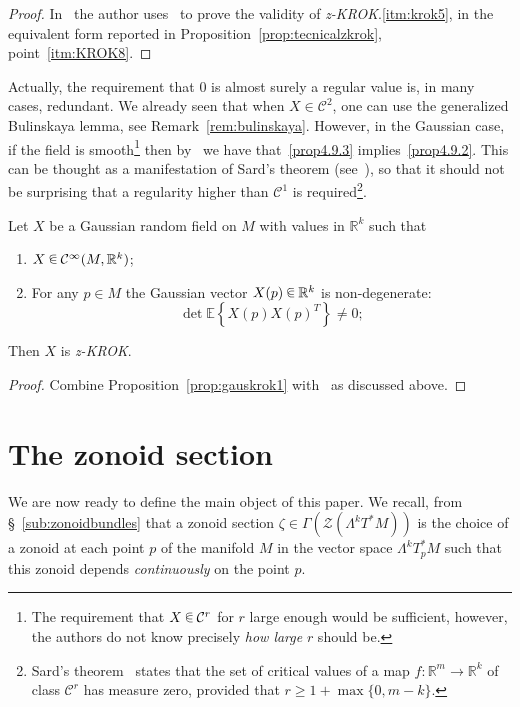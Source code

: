 \documentclass[AHL, Unicode, longabstracts, published]{cedram}
\newcommand{\R}{\mathbb{R}}
\newcommand{\EE}{\mathbb{E}}
\newcommand{\ZZ}{\mathscr{Z}}
\newcommand{\mC}{\mathcal{C}}
\newcommand{\zkrok}{\emph{z-KROK}\xspace}
\newcommand*\randin{
\mathchoice {\raisebox{-.35ex}{$\displaystyle{^\subset}$}\mkern-11.5mu\raisebox{+.45ex}{$\displaystyle{_\subset}$}} {\mkern+1mu\raisebox{-.27ex}{$\textstyle{^\subset}$}\mkern-11.7mu\raisebox{+.45ex}{$\textstyle{_\subset}$}} {\raisebox{.35ex}{$\scriptstyle\subset$}\mkern-14mu\raisebox{-.15ex}{$\scriptstyle\subset$}} {\raisebox{.3ex}{$\scriptscriptstyle\subset$}\mkern-13.5mu\raisebox{-.10ex}{$\scriptscriptstyle\subset$}}}
\begin{document}
\begin{proof}
In~\cite[Section~9.1]{KRStec} the author uses~\cite[Lemma~9.1]{KRStec} to prove the validity of \zkrok.\ref{itm:krok5}, in the equivalent form reported in Proposition~\ref{prop:tecnicalzkrok}, point~\eqref{itm:KROK8}.
\end{proof}

Actually, the requirement that $0$ is almost surely a regular value is, in many cases, redundant. We already seen that when $X\in\mC^2$, one can use the generalized Bulinskaya lemma, see Remark~\ref{rem:bulinskaya}. However, in the Gaussian case, if the field is smooth\footnote{The requirement that $X\,\randin\,\mC^r$ for $r$ large enough would be sufficient, however, the authors do not know precisely \emph{how large} $r$ should be.} then by~\cite[Theorem~7]{dtgrf} we have that~\eqref{prop4.9.3} implies~\eqref{prop4.9.2}. This can be thought as a manifestation of Sard's theorem (see~\cite{Hirsch}), so that it should not be surprising that a regularity higher than $\mC^1$ is required\footnote{Sard's theorem~\cite{sard} states that the set of critical values of a map $f\colon \R^m\to\R^k$ of class $\mC^r$ has measure zero, provided that $r\ge 1+\max\{0,m-k\}$.}.

\break
\begin{prop}\label{prop:Gausmthkrok}
Let $X$ be a Gaussian random field on $M$ with values in $\R^k$ such that
\begin{enumerate}
\item\label{prop4.10.1} $X\,\randin\, \mC^\infty(M,\R^k)$;
\item\label{prop4.10.2} For any $p\in M$ the Gaussian vector $X(p)\,\randin\, \R^k$ is non-degenerate:
\[
\det\EE\left\{X(p)X(p)^T\right\}\neq 0;
\]
\end{enumerate}
Then $X$ is \zkrok.
\end{prop}

\begin{proof}
Combine Proposition~\ref{prop:gauskrok1} with~\cite[Theorem~7]{dtgrf} as discussed above.
\end{proof}


\section{The zonoid section}\label{sec:zonoidsection}
We are now ready to define the main object of this paper. We recall, from \S~\ref{sub:zonoidbundles} that a zonoid section $\zeta\in\Gamma(\ZZ(\Lambda^kT^*M))$ is the choice of a zonoid at each point $p$ of the manifold $M$ in the vector space $\Lambda^kT_p^*M$ such that this zonoid depends \emph{continuously} on the point $p$.
\end{document}
